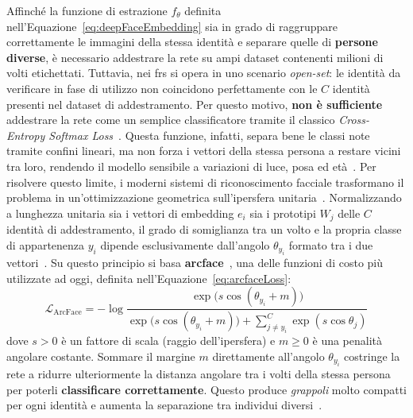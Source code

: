 Affinché la funzione di estrazione $f_\theta$ definita nell'Equazione~\eqref{eq:deepFaceEmbedding} sia in grado di raggruppare correttamente le immagini della stessa identità e separare quelle di \textbf{persone diverse}, è necessario addestrare la rete su ampi dataset contenenti milioni di volti etichettati.
Tuttavia, nei \gls{frs} si opera in uno scenario \textit{open-set}: le identità da verificare in fase di utilizzo non coincidono perfettamente con le $C$ identità presenti nel dataset di addestramento. 
Per questo motivo, \textbf{non è sufficiente} addestrare la rete come un semplice classificatore tramite il classico \textit{Cross-Entropy Softmax Loss}~\cite{kimAdaFaceQualityAdaptive2023}.
Questa funzione, infatti, separa bene le classi note tramite confini lineari, ma non forza i vettori della stessa persona a restare vicini tra loro, rendendo il modello sensibile a variazioni di luce, posa ed età~\cite{kimAdaFaceQualityAdaptive2023}.
Per risolvere questo limite, i moderni sistemi di riconoscimento facciale trasformano il problema in un'ottimizzazione geometrica sull'ipersfera unitaria~\cite{shiDocFaceMatchingID2018}. Normalizzando a lunghezza unitaria sia i vettori di embedding $e_i$ sia i prototipi $W_j$ delle $C$ identità di addestramento, il grado di somiglianza tra un volto e la propria classe di appartenenza $y_i$ dipende esclusivamente dall'angolo $\theta_{y_i}$ formato tra i due vettori~\cite{kimAdaFaceQualityAdaptive2023}.
Su questo principio si basa \textbf{\gls{arcface}}~\cite{dengArcFaceAdditiveAngular2022}, una delle funzioni di costo più utilizzate ad oggi, definita nell'Equazione~\eqref{eq:arcfaceLoss}:
\begin{equation}
\label{eq:arcfaceLoss}
\mathcal{L}_{\text{ArcFace}} = -\log \frac{\exp\big(s \cos(\theta_{y_i} + m)\big)}{\exp\big(s \cos(\theta_{y_i} + m)\big) + \sum_{j \neq y_i}^{C} \exp(s \cos\theta_j)}
\end{equation}
dove $s > 0$ è un fattore di scala (raggio dell'ipersfera) e $m \ge 0$ è una penalità angolare costante. Sommare il margine $m$ direttamente all'angolo $\theta_{y_i}$ costringe la rete a ridurre ulteriormente la distanza angolare tra i volti della stessa persona per poterli \textbf{classificare correttamente}. Questo produce \textit{grappoli} molto compatti per ogni identità e aumenta la separazione tra individui diversi~\cite{dengArcFaceAdditiveAngular2022}.

